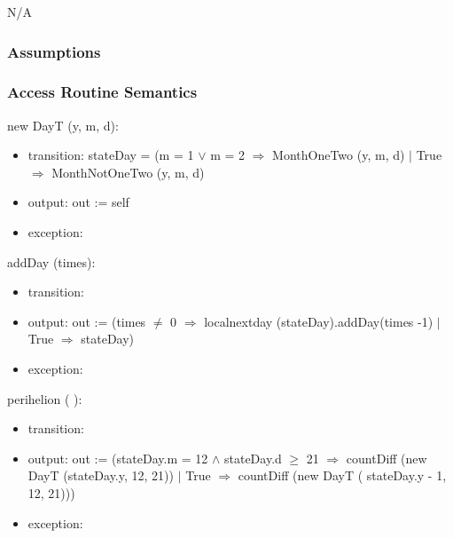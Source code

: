\documentclass[12pt, titlepage]{article}
\begin{document}
N/A\\

\subsubsection{Assumptions}


\subsubsection{ Access Routine Semantics}

\noindent  new DayT (y, m, d):
\begin{itemize}
\item transition:  stateDay = (m = 1 $\lor$ m = 2 $\Rightarrow$ MonthOneTwo (y, m, d) $|$ True $\Rightarrow$ MonthNotOneTwo (y, m, d)\\

\item output: out := self
\item exception: 
\end{itemize}

\noindent  addDay (times):
\begin{itemize}
\item transition: 
\item output: out := (times $\ne$ 0 $\Rightarrow$ localnextday (stateDay).addDay(times -1) $|$ True $\Rightarrow$ stateDay)

\item exception:
\end{itemize}

\noindent  perihelion ( ):
\begin{itemize}
\item transition: 
\item output: out := (stateDay.m = 12 $	\wedge$ stateDay.d $\geq	$ 21 $\Rightarrow$  countDiff (new DayT (stateDay.y, 12, 21)) $|$ True $\Rightarrow$ countDiff (new DayT ( stateDay.y - 1, 12, 21)))
\item exception:
\end{itemize}
\end{document}

